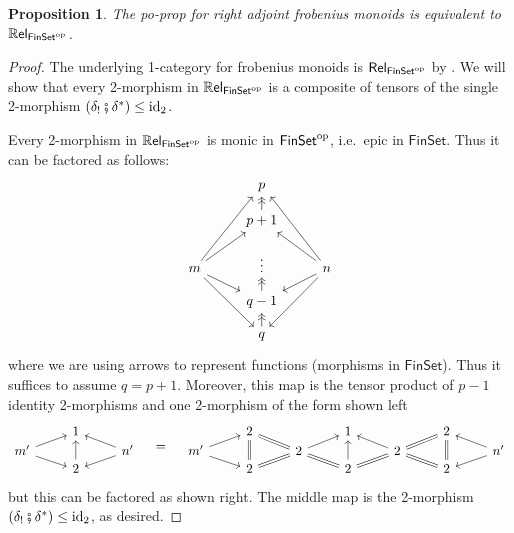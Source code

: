 \documentclass[11pt, oneside, article]{memoir}
\theoremstyle{plain}
\newtheorem{proposition}[theorem]{Proposition}
\theoremstyle{definition}
\theoremstyle{remark}
\newcommand{\Cat}[1]{{\mathsf{#1}}}%
\newcommand{\CCat}[1]{\mathbb{\StrLeft{#1}{1}}\Cat{\StrGobbleLeft{#1}{1}}}%
\newcommand{\funn}[1]{\mathrm{#1}}%
\newcommand{\tn}[1]{\textnormal{#1}}
\newcommand{\op}{^{\tn{op}}}
\newcommand{\finset}{\Cat{FinSet}}
\newcommand{\id}{\funn{id}}
\newcommand{\cp}{\mathbin{\fatsemi}}
\newcommand{\lsh}[1]{#1_!}
\newcommand{\ust}[1]{#1^\ast}
\newcommand{\rrel}[1]{\CCat{Rel}_{#1}}
\newcommand{\rel}[1]{\Cat{Rel}_{#1}}
\begin{document}
\begin{proposition} \label{prop.lafms_are_relfinsetop}
	The po-prop for right adjoint frobenius monoids is equivalent to $\rrel{\finset\op}$.
\end{proposition}
\begin{proof}
The underlying 1-category for frobenius monoids is $\rel{\finset\op}$ by \cite[Proposition 4.6]{coya2017corelations}. We will show that every 2-morphism in $\rrel{\finset\op}$ is a composite of tensors of the single 2-morphism $(\lsh{\delta}\cp\ust{\delta})\leq \id_2$.

Every 2-morphism in $\rrel{\finset\op}$ is monic in $\finset\op$, i.e.\ epic in $\finset$. Thus it can be factored as follows:
\[
\begin{tikzcd}[row sep=10pt]
  &
  p\\&
  p+1\ar[u, ->>]\\
  m\ar[uur]\ar[ur]\ar[dr]\ar[ddr]&
  \vdots&
  n\ar[uul]\ar[ul]\ar[dl]\ar[ddl]\\&
  q-1\ar[u, ->>]\\&
  q\ar[u, ->>]
\end{tikzcd}
\]
where we are using arrows to represent functions (morphisms in $\finset$). Thus it suffices to assume $q=p+1$. Moreover, this map is the tensor product of $p-1$ identity 2-morphisms and one 2-morphism of the form shown left
\[
\begin{tikzcd}[row sep=0pt]
	&
	1\\
	m'\ar[ur]\ar[dr]&&
	n'\ar[ul]\ar[dl]\\&
	2\ar[uu]
\end{tikzcd}
\quad=\quad
\begin{tikzcd}[row sep=0pt]
	&
	2&&
	1&&
	2\\
	m'\ar[ur]\ar[dr]&&
	2\ar[ul, equal]\ar[dl, equal]\ar[dr, equal]\ar[ur]&&
	2\ar[ul]\ar[dl, equal]\ar[ur, equal]\ar[dr, equal]&&
	n'\ar[ul]\ar[dl]\\&
	2\ar[uu, equal]&&
	2\ar[uu]&&
	2\ar[uu, equal]
\end{tikzcd}
\]
but this can be factored as shown right. The middle map is the 2-morphism $(\lsh{\delta}\cp\ust{\delta})\leq\id_2$, as desired.
\end{proof}
\end{document}

